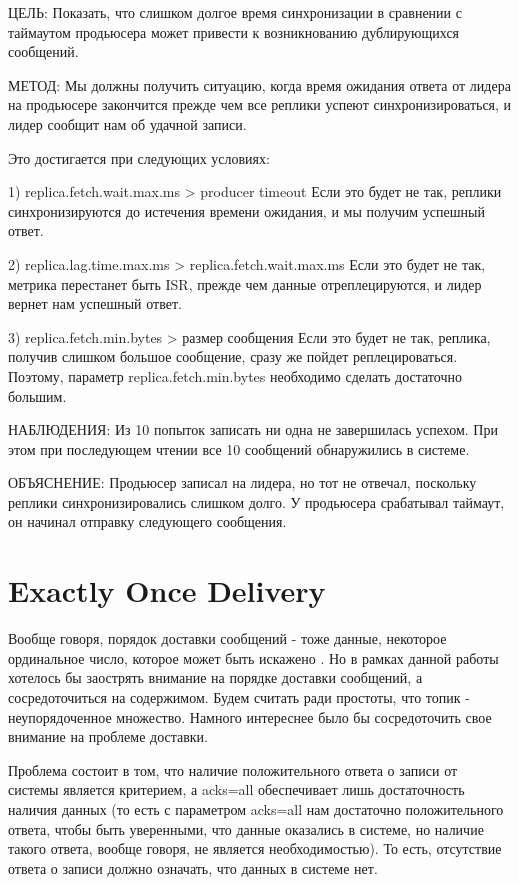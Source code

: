 \documentclass[11pt]{article}
\begin{document}
    ЦЕЛЬ: Показать, что слишком долгое время синхронизации в сравнении с таймаутом продьюсера может привести к
    возникнованию дублирующихся сообщений.

    МЕТОД: Мы должны получить ситуацию, когда время ожидания ответа от лидера на продьюсере закончится
    прежде чем все реплики успеют синхронизироваться, и лидер сообщит нам об удачной записи.
    
    Это достигается при следующих условиях:
    
        1) replica.fetch.wait.max.ms > producer timeout
            Если это будет не так, реплики синхронизируются до истечения времени ожидания, и мы получим успешный ответ.
    
        2) replica.lag.time.max.ms > replica.fetch.wait.max.ms
            Если это будет не так, метрика перестанет быть ISR, прежде чем данные отреплецируются, и лидер вернет нам
            успешный ответ.
    
        3) replica.fetch.min.bytes > размер сообщения
           Если это будет не так, реплика, получив слишком большое сообщение, сразу же пойдет реплецироваться.
           Поэтому, параметр replica.fetch.min.bytes необходимо сделать достаточно большим.
    
    НАБЛЮДЕНИЯ: Из 10 попыток записать ни одна не завершилась успехом. При этом при последующем чтении все 10
    сообщений обнаружились в системе.

    ОБЪЯСНЕНИЕ: Продьюсер записал на лидера, но тот не отвечал, поскольку реплики синхронизировались слишком долго.
    У продьюсера срабатывал таймаут, он начинал отправку следующего сообщения.

    \section{Exactly Once Delivery}
    Вообще говоря, порядок доставки сообщений - тоже данные, некоторое ординальное число, которое может быть искажено
    . Но в рамках данной работы хотелось бы заострять внимание на порядке доставки сообщений, а сосредоточиться на
    содержимом. Будем считать ради простоты, что топик - неупорядоченное множество. Намного интереснее было бы сосредоточить свое внимание на проблеме доставки.

    Проблема состоит в том, что наличие положительного ответа о записи от системы является критерием, а acks=all обеспечивает лишь достаточность наличия данных (то есть с параметром acks=all нам достаточно положительного ответа, чтобы быть уверенными, что данные оказались в системе, но наличие такого ответа, вообще говоря, не является необходимостью). То есть, отсутствие ответа о записи должно означать, что данных в системе нет.
\end{document}
